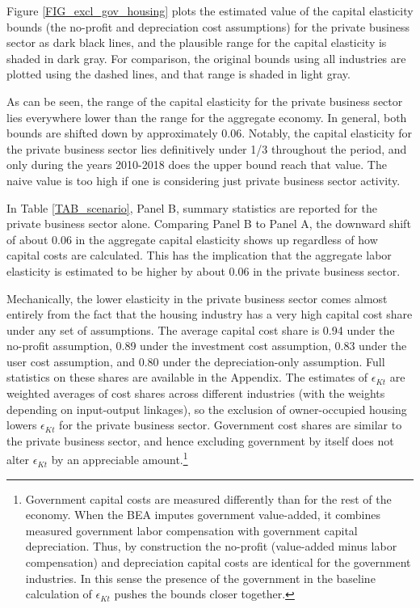 \documentclass[11pt]{article}
\begin{document}
Figure \ref{FIG_excl_gov_housing} plots the estimated value of the capital elasticity bounds (the no-profit and depreciation cost assumptions) for the private business sector as dark black lines, and the plausible range for the capital elasticity is shaded in dark gray. For comparison, the original bounds using all industries are plotted using the dashed lines, and that range is shaded in light gray. 

As can be seen, the range of the capital elasticity for the private business sector lies everywhere lower than the range for the aggregate economy. In general, both bounds are shifted down by approximately 0.06. Notably, the capital elasticity for the private business sector lies definitively under 1/3 throughout the period, and only during the years 2010-2018 does the upper bound reach that value. The naive value is too high if one is considering just private business sector activity.  

In Table \ref{TAB_scenario}, Panel B, summary statistics are reported for the private business sector alone. Comparing Panel B to Panel A, the downward shift of about 0.06 in the aggregate capital elasticity shows up regardless of how capital costs are calculated. This has the implication that the aggregate labor elasticity is estimated to be higher by about 0.06 in the private business sector. 

Mechanically, the lower elasticity in the private business sector comes almost entirely from the fact that the housing industry has a very high capital cost share under any set of assumptions. The average capital cost share is 0.94 under the no-profit assumption, 0.89 under the investment cost assumption, 0.83 under the user cost assumption, and 0.80 under the depreciation-only assumption. Full statistics on these shares are available in the Appendix. The estimates of $\epsilon_{Kt}$ are weighted averages of cost shares across different industries (with the weights depending on input-output linkages), so the exclusion of owner-occupied housing lowers $\epsilon_{Kt}$ for the private business sector. Government cost shares are similar to the private business sector, and hence excluding government by itself does not alter $\epsilon_{Kt}$ by an appreciable amount.\footnote{Government capital costs are measured differently than for the rest of the economy. When the BEA imputes government value-added, it combines measured government labor compensation with government capital depreciation. Thus, by construction the no-profit (value-added minus labor compensation) and depreciation capital costs are identical for the government industries. In this sense the presence of the government in the baseline calculation of $\epsilon_{Kt}$ pushes the bounds closer together.}
\end{document}
